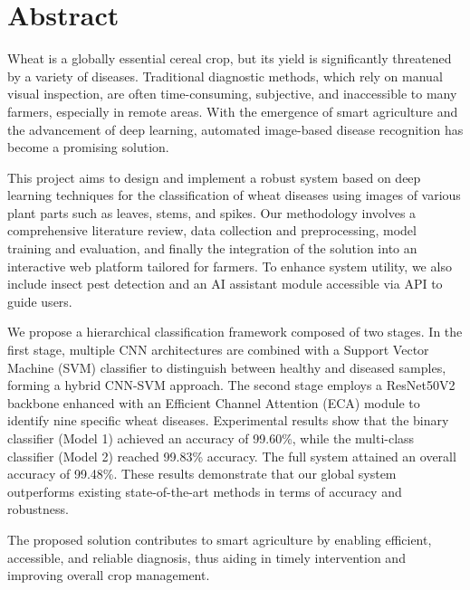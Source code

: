 \cleardoublepage
{}
\chapter*{{\Huge\bfseries Abstract}}   %
\thispagestyle{noheader}

\vspace{0.5cm}


Wheat is a globally essential cereal crop, but its yield is significantly threatened by a variety of diseases. Traditional diagnostic methods, which rely on manual visual inspection, are often time-consuming, subjective, and inaccessible to many farmers, especially in remote areas. With the emergence of smart agriculture and the advancement of deep learning, automated image-based disease recognition has become a promising solution.

This project aims to design and implement a robust system based on deep learning techniques for the classification of wheat diseases using images of various plant parts such as leaves, stems, and spikes. Our methodology involves a comprehensive literature review, data collection and preprocessing, model training and evaluation, and finally the integration of the solution into an interactive web platform tailored for farmers. To enhance system utility, we also include insect pest detection and an AI assistant module accessible via API to guide users.

We propose a hierarchical classification framework composed of two stages. In the first stage, multiple CNN architectures are combined with a Support Vector Machine (SVM) classifier to distinguish between healthy and diseased samples, forming a hybrid CNN-SVM approach. The second stage employs a ResNet50V2 backbone enhanced with an Efficient Channel Attention (ECA) module to identify nine specific wheat diseases. Experimental results show that the binary classifier (Model 1) achieved an accuracy of 99.60\%, while the multi-class classifier (Model 2) reached 99.83\% accuracy. The full system attained an overall accuracy of 99.48\%. These results demonstrate that our global system outperforms existing state-of-the-art methods in terms of accuracy and robustness.

The proposed solution contributes to smart agriculture by enabling efficient, accessible, and reliable diagnosis, thus aiding in timely intervention and improving overall crop management.


